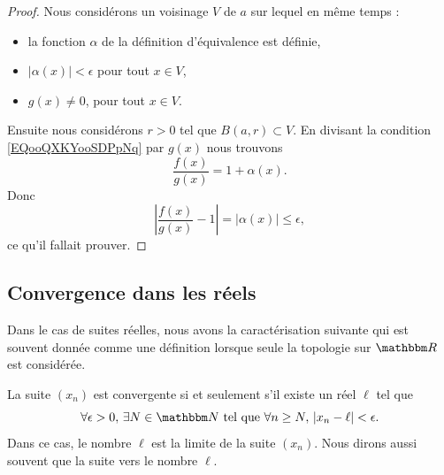 \begin{proof}
    Nous considérons un voisinage \( V\) de \( a\) sur lequel en même temps :
    \begin{itemize}
        \item 
            la fonction \( \alpha\) de la définition d'équivalence est définie,
        \item
            \( | \alpha(x) |<\epsilon\) pour tout \( x\in V\),
        \item
            \( g(x)\neq 0\), pour tout \( x\in V\).
    \end{itemize}
    Ensuite nous considérons \( r>0\) tel que \( B(a,r)\subset V\). En divisant la condition \eqref{EQooQXKYooSDPpNq} par \( g(x)\) nous trouvons
    \begin{equation}
        \frac{ f(x) }{ g(x) }=1+\alpha(x).
    \end{equation}
    Donc
    \begin{equation}
        | \frac{ f(x) }{ g(x) }-1 |=| \alpha(x) |\leq \epsilon,
    \end{equation}
    ce qu'il fallait prouver.
\end{proof}

\subsection{Convergence dans les réels}

Dans le cas de suites réelles, nous avons la caractérisation suivante qui est souvent donnée comme une définition lorsque seule la topologie sur \( \eR\) est considérée.
\begin{proposition}	\label{PropLimiteSuiteNum}
	La suite $(x_n)$ est convergente si et seulement s'il existe un réel $\ell$ tel que
	\begin{equation}		\label{EqDefLimSuite}
		\forall \epsilon>0,\,\exists N\in\eN\tq\forall n\geq N,\,| x_n-\ell |<\epsilon.
	\end{equation}
	Dans ce cas, le nombre $\ell$ est la limite de la suite $(x_n)$. Nous dirons aussi souvent que la suite  vers le nombre $\ell$.
\end{proposition}

